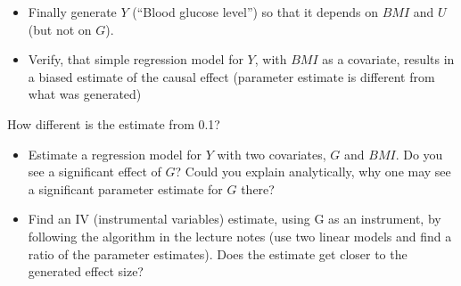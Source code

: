 \documentclass[
]{book}
\newenvironment{Shaded}{\begin{snugshade}}{\end{snugshade}}
\newcommand{\AttributeTok}[1]{\textcolor[rgb]{0.13,0.29,0.53}{#1}}
\newcommand{\CommentTok}[1]{\textcolor[rgb]{0.56,0.35,0.01}{\textit{#1}}}
\newcommand{\DecValTok}[1]{\textcolor[rgb]{0.00,0.00,0.81}{#1}}
\newcommand{\FloatTok}[1]{\textcolor[rgb]{0.00,0.00,0.81}{#1}}
\newcommand{\FunctionTok}[1]{\textcolor[rgb]{0.13,0.29,0.53}{\textbf{#1}}}
\newcommand{\NormalTok}[1]{#1}
\newcommand{\OtherTok}[1]{\textcolor[rgb]{0.56,0.35,0.01}{#1}}
\newcommand{\SpecialCharTok}[1]{\textcolor[rgb]{0.81,0.36,0.00}{\textbf{#1}}}
\providecommand{\tightlist}{%
  \setlength{\itemsep}{0pt}\setlength{\parskip}{0pt}}
\begin{document}
\begin{itemize}
\tightlist
\item
  Finally generate \(Y\) (``Blood glucose level'') so that it depends on \(BMI\) and \(U\) (but not on \(G\)).
\end{itemize}

\begin{Shaded}
\end{Shaded}

\begin{itemize}
\tightlist
\item
  Verify, that simple regression model for \(Y\), with \(BMI\) as a covariate, results in a biased
  estimate of the causal effect (parameter estimate is different from what was generated)
\end{itemize}

How different is the estimate from 0.1?

\begin{itemize}
\item
  Estimate a regression model for \(Y\) with two covariates, \(G\) and \(BMI\). Do you see a significant effect of \(G\)?
  Could you explain analytically, why one may see a significant parameter estimate for \(G\) there?
\item
  Find an IV (instrumental variables) estimate, using G as an instrument, by following the algorithm
  in the lecture notes (use two linear models and find a ratio of the parameter estimates).
  Does the estimate get closer to the generated effect size?
\end{itemize}

\begin{Shaded}
\end{Shaded}
\end{document}
